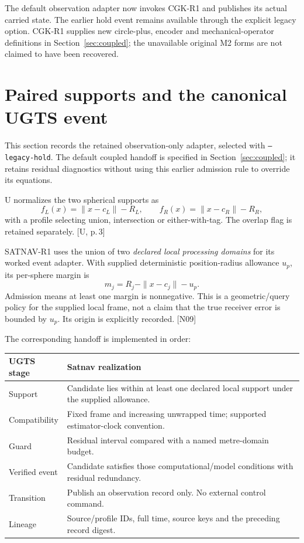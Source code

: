 \documentclass[11pt,a4paper]{article}
\newcommand{\code}[1]{\texttt{#1}}
\newcommand{\src}[1]{\textcolor{muted}{[U, #1]}}
\newcommand{\dec}[1]{\textcolor{accent}{[N#1]}}
\begin{document}
The default observation adapter now invokes CGK-R1 and publishes its actual
carried state. The earlier hold event remains available through the explicit
legacy option. CGK-R1 supplies new circle-plus, encoder and mechanical-operator
definitions in Section~\ref{sec:coupled}; the unavailable original M2 forms are
not claimed to have been recovered.
\clearpage

\section{Paired supports and the canonical UGTS event}
This section records the retained observation-only adapter, selected with
\code{--legacy-hold}. The default coupled handoff is specified in
Section~\ref{sec:coupled}; it retains residual diagnostics without using this
earlier admission rule to override its equations.

U normalizes the two spherical supports as
\begin{equation}
f_L(x)=\|x-c_L\|-R_L,\qquad f_R(x)=\|x-c_R\|-R_R,
\end{equation}
with a profile selecting union, intersection or either-with-tag. The overlap flag
is retained separately. \src{p.\,3}

SATNAV-R1 uses the union of two \emph{declared local processing domains} for its
worked event adapter. With supplied deterministic position-radius allowance $u_p$,
its per-sphere margin is
\begin{equation}
m_j=R_j-\|x-c_j\|-u_p.
\end{equation}
Admission means at least one margin is nonnegative. This is a geometric/query policy
for the supplied local frame, not a claim that the true receiver error is bounded by
$u_p$. Its origin is explicitly recorded. \dec{09}

The corresponding handoff is implemented in order:
\begin{center}
\begin{tabularx}{\textwidth}{@{}P{.24\textwidth}Y@{}}\toprule
\textbf{UGTS stage} & \textbf{Satnav realization}\\\midrule
Support & Candidate lies within at least one declared local support under the supplied allowance.\\
Compatibility & Fixed frame and increasing unwrapped time; supported estimator-clock convention.\\
Guard & Residual interval compared with a named metre-domain budget.\\
Verified event & Candidate satisfies those computational/model conditions with residual redundancy.\\
Transition & Publish an observation record only. No external control command.\\
Lineage & Source/profile IDs, full time, source keys and the preceding record digest.\\\bottomrule
\end{tabularx}
\end{center}
\end{document}
